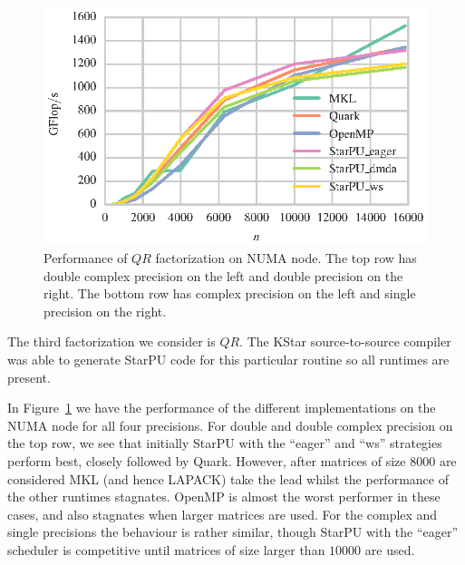 \documentclass[a4paper,12pt]{article}
\begin{document}
\begin{figure}[t]
  \includegraphics[scale=.85]{fig/kebnekaise_sgeqrf_weak_scaling.eps}
  \caption{Performance of $QR$ factorization on NUMA node.
    The top row has double complex precision on the left and double
    precision on the right.
    The bottom row has complex precision on the left and single
    precision on the right.}
  \label{fig.qr_numa}
\end{figure}

The third factorization we consider is $QR$.
The KStar source-to-source compiler was able to generate StarPU
code for this particular routine so all runtimes are present.

In Figure~\ref{fig.qr_numa} we have the performance of the different
implementations on the NUMA node for all four precisions.
For double and double complex precision on the top row,
we see that initially StarPU with the ``eager'' and ``ws'' strategies
perform best, closely followed by Quark.
However,
after matrices of size $8000$ are considered MKL
(and hence LAPACK) take the lead whilst the
performance of the other runtimes stagnates.
OpenMP is almost the worst performer in these cases,
and also stagnates when larger matrices are used.
For the complex and single precisions the behaviour is rather similar,
though StarPU with the ``eager'' scheduler is competitive until
matrices of size larger than $10000$ are used.
\end{document}
